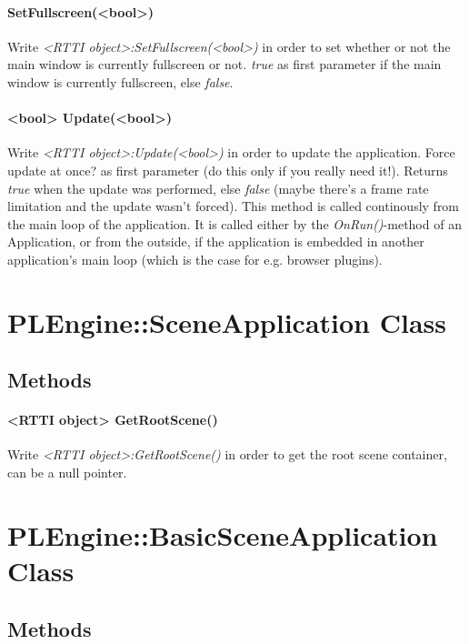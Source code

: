 \paragraph{SetFullscreen(<bool>)}
Write \emph{<RTTI object>:SetFullscreen(<bool>)} in order to set whether or not the main window is currently fullscreen or not. \emph{true} as first parameter if the main window is currently fullscreen, else \emph{false}.

\paragraph{<bool> Update(<bool>)}
Write \emph{<RTTI object>:Update(<bool>)} in order to update the application. Force update at once? as first parameter (do this only if you really need it!). Returns \emph{true} when the update was performed, else \emph{false} (maybe there's a frame rate limitation and the update wasn't forced). This method is called continously from the main loop of the application. It is called either by the \emph{OnRun()}-method of an Application, or from the outside, if the application is embedded in another application's main loop (which is the case for e.g. browser plugins).




\section{PLEngine::SceneApplication Class}


\subsection{Methods}

\paragraph{<RTTI object> GetRootScene()}
Write \emph{<RTTI object>:GetRootScene()} in order to get the root scene container, can be a null pointer.




\section{PLEngine::BasicSceneApplication Class}


\subsection{Methods}

